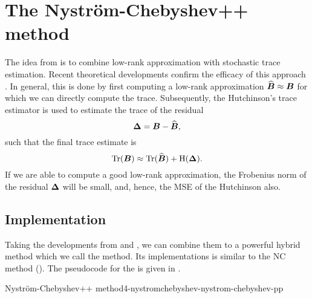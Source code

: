 \chapter{The Nystr\"om-Chebyshev++ method}
\label{chp:4-nystromchebyshev}

The idea from \cite{lin2017randomized} is to combine low-rank approximation
with stochastic trace estimation. Recent theoretical developments confirm the
efficacy of this approach \cite{meyer2021hutch,persson2022hutch}. In general,
this is done by first computing a low-rank approximation $\widehat{\boldsymbol{B}} \approx \boldsymbol{B}$
for which we can directly compute the trace. Subsequently, the
Hutchinson's trace estimator 
is used to estimate the trace of the residual
\begin{equation}
    \boldsymbol{\Delta} = \boldsymbol{B} - \widehat{\boldsymbol{B}},
    \label{equ:4-nystromchebyshev-residual}
\end{equation}
such that the final trace estimate is
\begin{equation}
    \operatorname{Tr}(\boldsymbol{B}) \approx \operatorname{Tr}(\widehat{\boldsymbol{B}}) + \operatorname{H}(\boldsymbol{\Delta}).
    \label{equ:4-nystromchebyshev-hutch-pp}
\end{equation}
If we are able to compute a good low-rank approximation, the Frobenius norm
of the residual $\boldsymbol{\Delta}$ will be small, and, hence, the \gls{MSE}
of the Hutchinson  also.


\section{Implementation}
\label{sec:4-nystromchebyshev-implementation}

Taking the developments from  and ,
we can combine them to a powerful hybrid method which we call the 
method. Its implementations is similar to the \gls{NC} method ().
The pseudocode for the  is given in .


\begin{algo}{Nystr\"om-Chebyshev++ method}{4-nystromchebyshev-nystrom-chebyshev-pp}
    
\end{algo}

